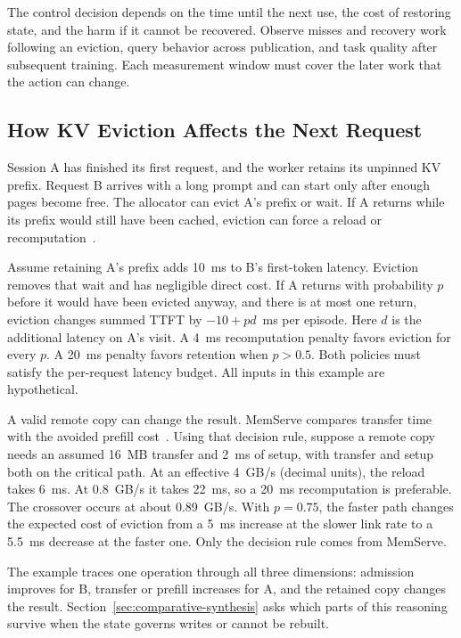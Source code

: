 \documentclass[manuscript]{acmart}
\begin{document}
The control decision depends on the time until the next use, the cost of restoring state, and the harm if it cannot be recovered. Observe misses and recovery work following an eviction, query behavior across publication, and task quality after subsequent training. Each measurement window must cover the later work that the action can change.

\subsection{How KV Eviction Affects the Next Request}
\label{sec:propagation-trace}

Session A has finished its first request, and the worker retains its unpinned KV prefix. Request B arrives with a long prompt and can start only after enough pages become free. The allocator can evict A's prefix or wait. If A returns while its prefix would still have been cached, eviction can force a reload or recomputation~\cite{kwon2023pagedattention,hu2024memserve,liu2025lmcache}.

Assume retaining A's prefix adds 10~ms to B's first-token latency. Eviction removes that wait and has negligible direct cost. If A returns with probability \(p\) before it would have been evicted anyway, and there is at most one return, eviction changes summed TTFT by \(-10+p d\)~ms per episode. Here \(d\) is the additional latency on A's visit. A 4~ms recomputation penalty favors eviction for every \(p\). A 20~ms penalty favors retention when \(p>0.5\). Both policies must satisfy the per-request latency budget. All inputs in this example are hypothetical.

A valid remote copy can change the result. MemServe compares transfer time with the avoided prefill cost~\cite[Sec.~5.3.1]{hu2024memserve}. Using that decision rule, suppose a remote copy needs an assumed 16~MB transfer and 2~ms of setup, with transfer and setup both on the critical path. At an effective 4~GB/s (decimal units), the reload takes 6~ms. At 0.8~GB/s it takes 22~ms, so a 20~ms recomputation is preferable. The crossover occurs at about 0.89~GB/s. With \(p=0.75\), the faster path changes the expected cost of eviction from a 5~ms increase at the slower link rate to a 5.5~ms decrease at the faster one. Only the decision rule comes from MemServe.

The example traces one operation through all three dimensions: admission improves for B, transfer or prefill increases for A, and the retained copy changes the result. Section~\ref{sec:comparative-synthesis} asks which parts of this reasoning survive when the state governs writes or cannot be rebuilt.
\end{document}
